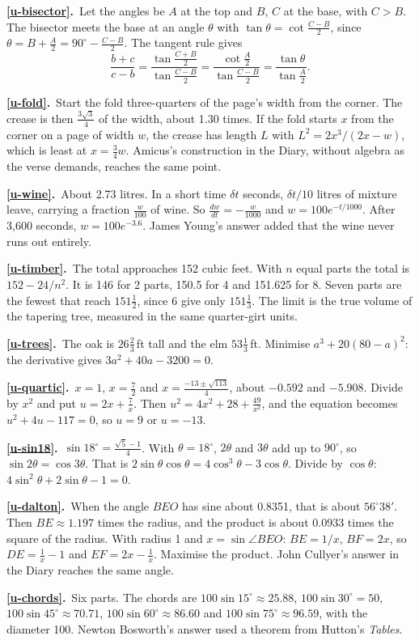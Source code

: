 \documentclass[11pt,a4paper]{article}
\newcommand{\ans}[2]{\par\smallskip\noindent\textbf{\ref{#1}.}\ #2}
\begin{document}
\ans{u-bisector}{Let the angles be $A$ at the top and $B$, $C$ at the base, with $C > B$.
The bisector meets the base at an angle $\theta$ with $\tan\theta =
\cot\tfrac{C-B}{2}$, since $\theta = B + \tfrac A2 = 90^\circ - \tfrac{C-B}{2}$. The tangent
rule gives
\[
\frac{b + c}{c - b} = \frac{\tan\tfrac{C+B}{2}}{\tan\tfrac{C-B}{2}}
= \frac{\cot\tfrac A2}{\tan\tfrac{C-B}{2}} = \frac{\tan\theta}{\tan\tfrac A2}.
\]}
\ans{u-fold}{Start the fold three-quarters of the page's width from the corner. The
crease is then $\tfrac{3\sqrt3}{4}$ of the width, about 1.30 times. If the fold starts $x$
from the corner on a page of width $w$, the crease has length $L$ with
$L^2 = 2x^3/(2x - w)$, which is least at $x = \tfrac34w$. Amicus's construction in the
Diary, without algebra as the verse demands, reaches the same point.}
\ans{u-wine}{About 2.73 litres. In a short time $\delta t$ seconds, $\delta t/10$ litres
of mixture leave, carrying a fraction $\tfrac{w}{100}$ of wine. So
$\tfrac{dw}{dt} = -\tfrac{w}{1000}$ and $w = 100e^{-t/1000}$. After 3,600 seconds,
$w = 100e^{-3.6}$. James Young's answer added that the wine never runs out entirely.}
\ans{u-timber}{The total approaches 152 cubic feet. With $n$ equal parts the total is
$152 - 24/n^2$. It is 146 for 2 parts, 150.5 for 4 and 151.625 for 8. Seven parts are
the fewest that reach $151\tfrac12$, since 6 give only $151\tfrac13$. The limit is the
true volume of the tapering tree, measured in the same quarter-girt units.}
\ans{u-trees}{The oak is $26\tfrac23$\,ft tall and the elm $53\tfrac13$\,ft. Minimise
$a^3 + 20(80 - a)^2$: the derivative gives $3a^2 + 40a - 3200 = 0$.}
\ans{u-quartic}{$x = 1$, $x = \tfrac72$ and $x = \tfrac{-13\pm\sqrt{113}}{4}$, about
$-0.592$ and $-5.908$. Divide by $x^2$ and put $u = 2x + \tfrac7x$. Then
$u^2 = 4x^2 + 28 + \tfrac{49}{x^2}$, and the equation becomes $u^2 + 4u - 117 = 0$, so
$u = 9$ or $u = -13$.}
\ans{u-sin18}{$\sin18^\circ = \tfrac{\sqrt5 - 1}{4}$. With $\theta = 18^\circ$, $2\theta$
and $3\theta$ add up to $90^\circ$, so $\sin2\theta = \cos3\theta$. That is
$2\sin\theta\cos\theta = 4\cos^3\theta - 3\cos\theta$. Divide by $\cos\theta$:
$4\sin^2\theta + 2\sin\theta - 1 = 0$.}
\ans{u-dalton}{When the angle $BEO$ has sine about 0.8351, that is about $56^\circ38'$.
Then $BE \approx 1.197$ times the radius, and the product is about 0.0933 times the square
of the radius. With radius 1 and $x = \sin\angle BEO$: $BE = 1/x$, $BF = 2x$, so
$DE = \tfrac1x - 1$ and $EF = 2x - \tfrac1x$. Maximise the product. John Cullyer's answer
in the Diary reaches the same angle.}
\ans{u-chords}{Six parts. The chords are $100\sin15^\circ \approx 25.88$, $100\sin30^\circ
= 50$, $100\sin45^\circ \approx 70.71$, $100\sin60^\circ \approx 86.60$ and
$100\sin75^\circ \approx 96.59$, with the diameter 100. Newton Bosworth's answer used a
theorem from Hutton's \textit{Tables}.}
\end{document}
